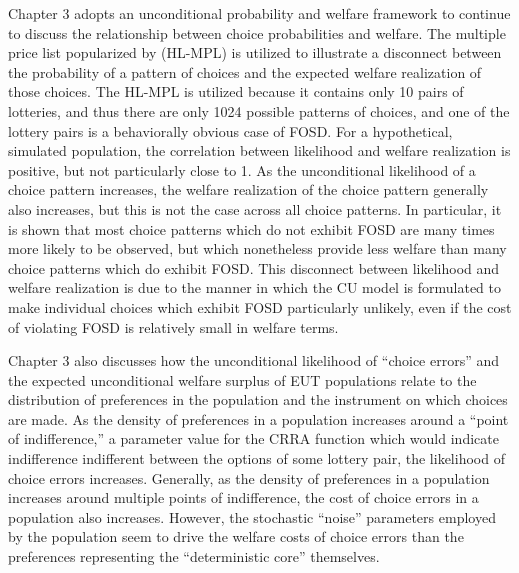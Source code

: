 \documentclass[../main.tex]{subfiles}
\begin{document}
Chapter 3 adopts an unconditional probability and welfare framework to continue to discuss the relationship between choice probabilities and welfare.
The multiple price list popularized by \textcite{Holt2002} (HL-MPL) is utilized to illustrate a disconnect between the probability of a pattern of choices and the expected welfare realization of those choices.
The HL-MPL is utilized because it contains only 10 pairs of lotteries, and thus there are only 1024 possible patterns of choices, and one of the lottery pairs is a behaviorally obvious case of FOSD.
For a hypothetical, simulated population, the correlation between likelihood and welfare realization is positive, but not particularly close to 1.
As the unconditional likelihood of a choice pattern increases, the welfare realization of the choice pattern generally also increases, but this is not the case across all choice patterns.
In particular, it is shown that most choice patterns which do not exhibit FOSD are many times more likely to be observed, but which nonetheless provide less welfare than many choice patterns which do exhibit FOSD.
This disconnect between likelihood and welfare realization is due to the manner in which the CU model is formulated to make individual choices which exhibit FOSD particularly unlikely, even if the cost of violating FOSD is relatively small in welfare terms.

Chapter 3 also discusses how the unconditional likelihood of \enquote{choice errors} and the expected unconditional welfare surplus of EUT populations relate to the distribution of preferences in the population and the instrument on which choices are made.
As the density of preferences in a population increases around a \enquote{point of indifference,} a parameter value for the CRRA function which would indicate indifference indifferent between the options of some lottery pair, the likelihood of choice errors increases.
Generally, as the density of preferences in a population increases around multiple points of indifference, the cost of choice errors in a population also increases.
However, the stochastic \enquote{noise} parameters employed by the population seem to drive the welfare costs of choice errors than the preferences representing the \enquote{deterministic core} themselves.
\end{document}

